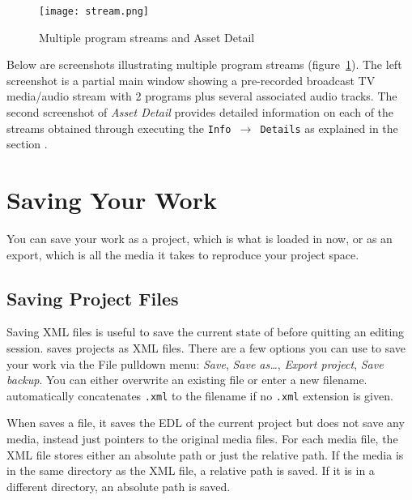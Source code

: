 \begin{figure}[htpb]
    \centering
    \texttt{[image: stream.png]}
    \caption{Multiple program streams and Asset Detail}
    \label{fig:stream}
\end{figure}

Below are screenshots illustrating multiple program streams (figure~\ref{fig:stream}).  The left screenshot is a partial main \CGG{} window showing a pre-recorded broadcast TV media/audio stream with 2 programs plus several associated audio tracks.  The second screenshot of \textit{Asset Detail} provides detailed information on each of the streams obtained through executing the \texttt{Info $\rightarrow$  Details} as explained in the section .

\section{Saving Your Work}%
\label{sec:saving_your_work}

You can save your work as a project, which is what is loaded in \CGG{} now, or as an export, which is all the media it takes to reproduce your project space.

\subsection{Saving Project Files}%
\label{sub:saving_project_files}

Saving  XML files is useful to save the current state of \CGG{} before quitting an editing session. \CGG{} saves projects as XML files. There are a few options you can use to save your work via the File pulldown menu: \textit{Save}, \textit{Save as\dots}, \textit{Export project}, \textit{Save backup}.  You can either overwrite an existing file or enter a new filename. \CGG{} automatically concatenates \texttt{.xml} to the filename if no \texttt{.xml} extension is given.

When \CGG{} saves a file, it saves the EDL of the current project but does not save any media, instead just pointers to the original media files. For each media file, the XML file stores either an absolute path or just the relative path. If the media is in the same directory as the XML file, a relative path is saved. If it is in a different directory, an absolute path is saved.

